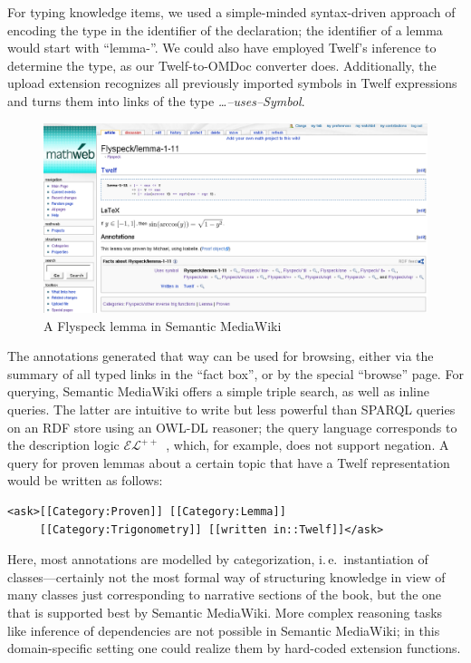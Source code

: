 \documentclass{llncs}
\begin{document}
For typing knowledge items, we used a simple-minded syntax-driven approach of encoding the
type in the identifier of the declaration; the identifier of a lemma would start with
``lemma-''.  We could also have employed Twelf's inference to determine the
type, as our Twelf-to-OMDoc converter does.
Additionally, the upload extension recognizes all previously imported symbols in Twelf
expressions and turns them into links of the type \textit{\ldots--uses--Symbol}.

\begin{figure}
  \centering
  \includegraphics[width=\textwidth]{smw-lemma}
  \caption[A Flyspeck lemma in Semantic MediaWiki]{A Flyspeck lemma in Semantic
    MediaWiki\protect\footnotemark}
  \label{fig:smw-lemma}
\end{figure}
\addtocounter{footnote}{-1}

The annotations generated that way can be used for browsing, either via the summary of all
typed links in the ``fact box'', or by the special ``browse'' page.  For querying,
Semantic MediaWiki offers a simple triple search, as well as inline queries.  The latter
are intuitive to write but less powerful than SPARQL queries on an RDF store using an
OWL-DL reasoner; the query language corresponds to the description logic
$\mathcal{EL}^{++}$~\cite{KrSchVr:semwiki-reasoning07}, which, for example, does not
support negation.  A query for proven lemmas about a certain topic that have a Twelf
representation would be written as follows:

\begin{lstlisting}
<ask>[[Category:Proven]] [[Category:Lemma]]
     [[Category:Trigonometry]] [[written in::Twelf]]</ask>
\end{lstlisting}

Here, most annotations are modelled by categorization, i.\,e.\ instantiation of
classes---certainly not the most formal way of structuring knowledge in view of many
classes just corresponding to narrative sections of the book, but the one that is
supported best by Semantic MediaWiki.  More complex reasoning tasks like inference of
dependencies are not possible in Semantic MediaWiki; in this domain-specific setting one
could realize them by hard-coded extension functions.
\end{document}
